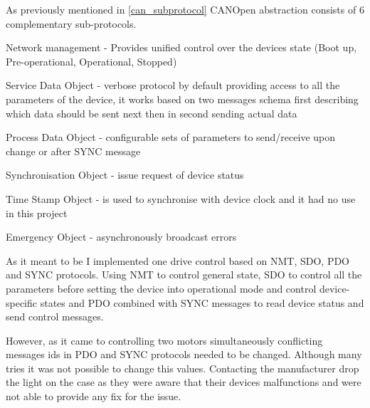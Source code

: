 As previously mentioned in \ref{can_subprotocol} CANOpen abstraction consists of 6 complementary sub-protocols.
\begin{description}[labelindent=1cm]
    \item[NMT] Network management - Provides unified control over the devices state (Boot up, Pre-operational, Operational, Stopped)
    \item[SDO] Service Data Object - verbose protocol by default providing access to all the parameters of the device, it works based on two messages schema first describing which data should be sent next then in second sending actual data
    \item[PDO] Process Data Object - configurable sets of parameters to send/receive upon change or after SYNC message
    \item[SYNC]    Synchronisation Object - issue request of device status
    \item[TIME]    Time Stamp Object - is used to synchronise with device clock and it had no use in this project
    \item[EMCY] Emergency Object - asynchronously broadcast errors
\end{description}

As it meant to be I implemented one drive control based on NMT, SDO, PDO and SYNC protocols. Using NMT to control general state, SDO to control all the parameters before setting the device into operational mode and control device-specific states and PDO combined with SYNC messages to read device status and send control messages.

However, as it came to controlling two motors simultaneously conflicting messages ids in PDO and SYNC protocols needed to be changed. Although many tries it was not possible to change this values. Contacting the manufacturer drop the light on the case as they were aware that their devices malfunctions and were not able to provide any fix for the issue.

